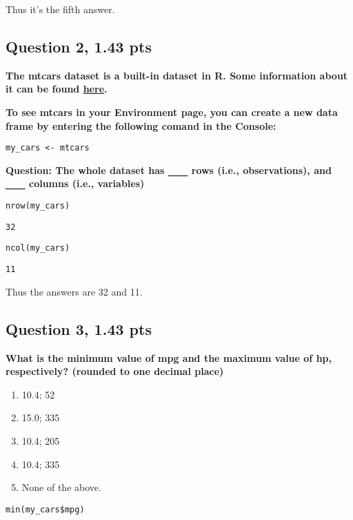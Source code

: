 \documentclass[11pt]{article}
\begin{document}
Thus it's the fifth answer.

\subsection*{Question 2, 1.43 pts}
\label{sec:org902cac7}
\textbf{The mtcars dataset is a built-in dataset in R. Some information about it can be found \href{https://rpubs.com/neros/61800}{here}.}

\textbf{To see mtcars in your Environment page, you can create a new data frame by entering the following comand in the Console:}

\begin{verbatim}
my_cars <- mtcars
\end{verbatim}


\textbf{Question: The whole dataset has \texttt{\_\_\_\_}  rows (i.e., observations), and \texttt{\_\_\_\_} columns (i.e., variables)}
\begin{verbatim}
nrow(my_cars)
\end{verbatim}

\begin{verbatim}
32
\end{verbatim}


\begin{verbatim}
ncol(my_cars)
\end{verbatim}

\begin{verbatim}
11
\end{verbatim}


Thus the answers are 32 and 11.

\subsection*{Question 3, 1.43 pts}
\label{sec:org8001247}
\textbf{What is the minimum value of mpg and the maximum value of hp, respectively? (rounded to one decimal place)}
\begin{enumerate}
\item 10.4; 52
\item 15.0; 335
\item 10.4; 205
\item 10.4; 335
\item None of the above.
\end{enumerate}


\begin{verbatim}
min(my_cars$mpg)
\end{verbatim}
\end{document}
